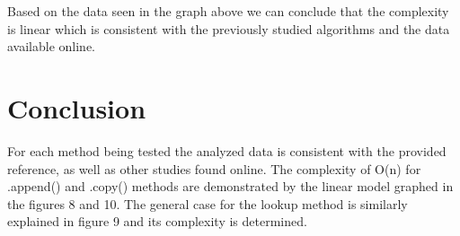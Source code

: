 \documentclass[12pt]{article}
\begin{document}
Based on the data seen in the graph above we can conclude that the complexity is linear which is consistent with the previously studied algorithms and the data available online.

\section{Conclusion}

For each method being tested the analyzed data is consistent with the provided reference, as well as other studies found online. The complexity of O(n) for .append() and .copy() methods are demonstrated by the linear model graphed in the figures 8 and 10. The general case for the lookup method is similarly explained in figure 9 and its complexity is determined.
\end{document}

